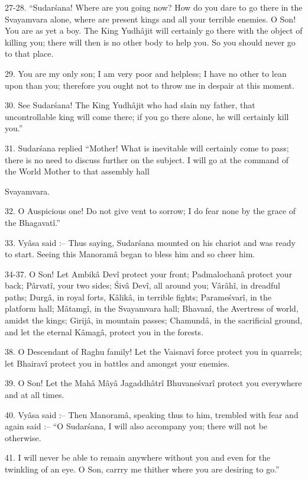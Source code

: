 27-28. ``Sudar\'sana! Where are you going now? How do you dare to go there in the Svayamvara alone, where are present kings and all your terrible enemies. O Son! You are as yet a boy. The King Yudh\^ajit will certainly go there with the object of killing you; there will then is no other body to help you. So you should never go to that place.

29. You are my only son; I am very poor and helpless; I have no other to lean upon than you; therefore you ought not to throw me in despair at this moment.

30. See Sudar\'sana! The King Yudh\^ajit who had slain my father, that uncontrollable king will come there; if you go there alone, he will certainly kill you.''

31. Sudar\'sana replied ``Mother! What is inevitable will certainly come to pass; there is no need to discuss further on the subject. I will go at the command of the World Mother to that assembly hall

Svayamvara.

32. O Auspicious one! Do not give vent to sorrow; I do fear none by the grace of the Bhagavat\^i.''

33. Vy\^asa said :-- Thus saying, Sudar\'sana mounted on his chariot and was ready to start. Seeing this Manoram\^a began to bless him and so cheer him.

34-37. O Son! Let Ambik\^a Dev\^i protect your front; Padmalochan\^a protect your back; P\^arvat\^i, your two sides; \'Siv\^a Dev\^i, all around you; V\^ar\^ah\^i, in dreadful paths; Durg\^a, in royal forts, K\^alik\^a, in terrible fights; Parame\'svar\^i, in the platform hall; M\^atamg\^i, in the Svayamvara hall; Bhavan\^i, the Avertress of world, amidst the kings; Girij\^a, in mountain passes; Chamund\^a, in the sacrificial ground, and let the eternal K\^amag\^a, protect you in the forests.

38. O Descendant of Raghu family! Let the Vaisnav\^i force protect you in quarrels; let Bhairav\^i protect you in battles and amongst your enemies.

39. O Son! Let the Mah\^a M\^ay\^a Jagaddh\^atr\^i Bhuvane\'svar\^i protect you everywhere and at all times.

40. Vy\^asa said :-- Then Manoram\^a, speaking thus to him, trembled with fear and again said :-- ``O Sudar\'sana, I will also accompany you; there will not be otherwise.

41. I will never be able to remain anywhere without you and even for the twinkling of an eye. O Son, carrry me thither where you are desiring to go.''

